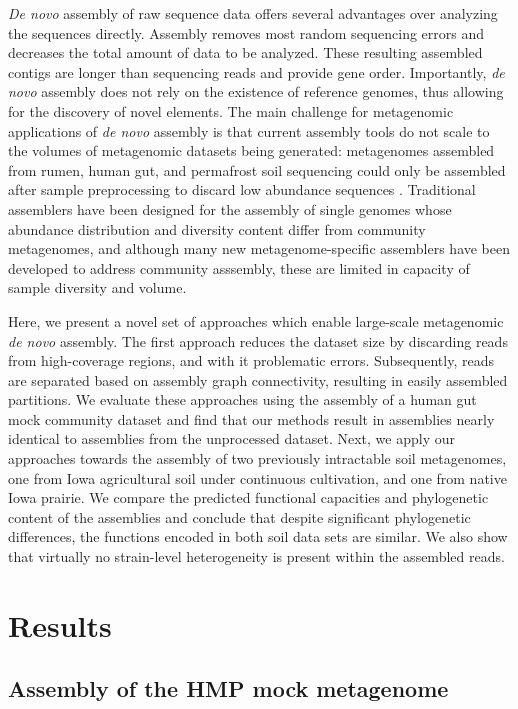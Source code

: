 \documentclass[11pt]{article} %
\begin{document}
\emph{De novo} assembly of raw sequence data offers several
advantages over analyzing the sequences directly.  Assembly removes most
random sequencing errors and decreases the total amount of data to be
analyzed.
These resulting assembled contigs are longer than sequencing reads and
provide gene order.  Importantly, \emph{de novo} assembly does not
rely on the existence of reference genomes, thus allowing for the
discovery of novel elements.  The main challenge for metagenomic
applications of \emph{de novo} assembly is that current assembly tools
do not scale to the volumes of metagenomic datasets being generated:
metagenomes assembled from rumen, human gut, and permafrost soil
sequencing could only be assembled after sample preprocessing to
discard low abundance sequences
\cite{Hess:2011p686,Mackelprang:2011p1087,Qin:2010p189}.  Traditional
assemblers have been designed for the assembly of single genomes whose
abundance distribution and diversity content differ from community metagenomes,
and although many
new metagenome-specific assemblers have been developed to address
community asssembly,
these are limited in
capacity of sample diversity and volume.

Here, we present a novel set of approaches which enable large-scale
metagenomic {\em de novo} assembly.  The first approach reduces the dataset
size by discarding reads from high-coverage regions, and with it
problematic errors.  Subsequently, reads are separated based on
assembly graph connectivity, resulting in easily assembled partitions.
We evaluate these approaches using the assembly of a human gut mock
community dataset and find that our methods result in assemblies
nearly identical to assemblies from the unprocessed dataset.  Next, we
apply our approaches towards the assembly of two previously
intractable soil metagenomes, one from Iowa agricultural soil under
continuous cultivation, and one from native Iowa prairie.  We compare
the predicted functional capacities and phylogenetic content of the
assemblies and conclude that despite significant phylogenetic
differences, the functions encoded in both soil data sets are similar.
We also show that virtually no strain-level heterogeneity is present
within the assembled reads.

\section{Results}

\subsection{Assembly of the HMP mock metagenome}
\end{document}
